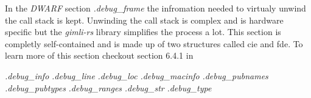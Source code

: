 In the \emph{DWARF} section \emph{.debug\_frame} the infromation needed to virtualy unwind the call stack is kept.
Unwinding the call stack is complex and is hardware specific but the \emph{gimli-rs} library simplifies the process a lot.
This section is completly self-contained and is made up of two structures called \acrfull{cie} and \acrfull{fde}.
To learn more of this section checkout section 6.4.1 in \cite{dwarf}


\emph{.debug\_info}
\emph{.debug\_line}
\emph{.debug\_loc}
\emph{.debug\_macinfo}
\emph{.debug\_pubnames}
\emph{.debug\_pubtypes}
\emph{.debug\_ranges}
\emph{.debug\_str}
\emph{.debug\_type}

